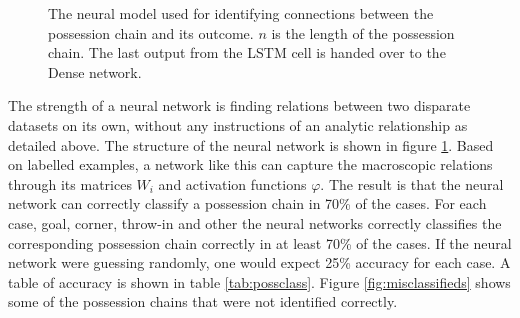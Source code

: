 \documentclass[10pt, a4paper]{UUThesisTemplate}
\begin{document}
\begin{figure}
\vspace{-2cm}
\caption{The neural model used for identifying connections between the possession chain and its outcome. $n$ is the length of the possession chain. The last output from the LSTM cell is handed over to the Dense network.}\label{fig:simplelstmnn}
\end{figure}

The strength of a neural network is finding relations between two disparate datasets on its own, without any instructions of an analytic relationship as detailed above. The structure of the neural network is shown in figure \ref{fig:simplelstmnn}. Based on labelled examples, a network like this can capture the macroscopic relations through its matrices $W_i$ and activation functions $\varphi$. The result is that the neural network can correctly classify a possession chain in 70\% of the cases. For each case, goal, corner, throw-in and other the neural networks correctly classifies the corresponding possession chain correctly in at least 70\% of the cases. If the neural network were guessing randomly, one would expect 25\% accuracy for each case. A table of accuracy is shown in table \ref{tab:possclass}. Figure \ref{fig:misclassifieds} shows some of the possession chains that were not identified correctly.
\end{document}
